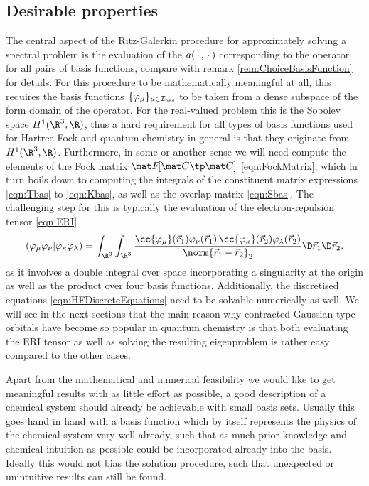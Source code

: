 \subsection{Desirable properties}
\label{sec:BasisDesiredProperties}
The central aspect of the Ritz-Galerkin procedure for
approximately solving a spectral problem
is the evaluation of the $a(\,\cdot\,,\,\cdot\,)$
corresponding to the operator for all pairs of basis functions,
compare with remark \vref{rem:ChoiceBasisFunction} for details.
For this procedure to be mathematically meaningful at all,
this requires the basis functions $\{\varphi_\mu\}_{\mu\in\mathcal{I}_\text{bas}}$
to be taken from a dense subspace of the form domain of the operator.
For the real-valued \HF problem this is the Sobolev space $H^1(\R^3, \R)$,
thus a hard requirement for all types of basis functions
used for Hartree-Fock and quantum chemistry in general is that
they originate from $H^1(\R^3, \R)$.
Furthermore, in some or another sense we will need compute the elements
of the Fock matrix $\matFfull$ \eqref{eqn:FockMatrix},
which in turn boils down to computing the integrals of the constituent
matrix expressions \eqref{eqn:Tbas} to \eqref{eqn:Kbas},
as well as the overlap matrix \eqref{eqn:Sbas}.
The challenging step for this is typically the evaluation
of the electron-repulsion tensor \eqref{eqn:ERI}
\[
	\eriMu{\varphi_\mu \varphi_\nu}{\varphi_\kappa \varphi_\lambda}
		= \int_{\R^3} \int_{\R^3}
			\frac{\cc{\varphi_\mu}(\vec{r}_1) \varphi_\nu(\vec{r}_1)
				\,\cc{\varphi_\kappa}(\vec{r}_2) \varphi_\lambda(\vec{r}_2)}
			{\norm{\vec{r}_1 - \vec{r}_2}_2}
			\D \vec{r}_1 \D \vec{r}_2.
\]
as it involves a double integral over space
incorporating a singularity at the origin
as well as the product over four basis functions.
Additionally, the discretised \HF equations \eqref{eqn:HFDiscreteEquations}
need to be solvable numerically as well.
We will see in the next sections
that the main reason why contracted Gaussian-type orbitals
have become so popular in quantum chemistry
is that both evaluating the ERI tensor
as well as solving the resulting eigenproblem
is rather easy compared to the other cases.

Apart from the mathematical and numerical feasibility
we would like to get meaningful results with as little effort as possible,
\ie a good description of a chemical system should already be achievable
with small basis sets.
Usually this goes hand in hand with a basis function
which by itself represents the physics
of the chemical system very well already,
such that as much prior knowledge and chemical intuition as possible
could be incorporated already into the basis.
Ideally this would not bias the solution procedure,
such that unexpected or unintuitive results can still be found.

